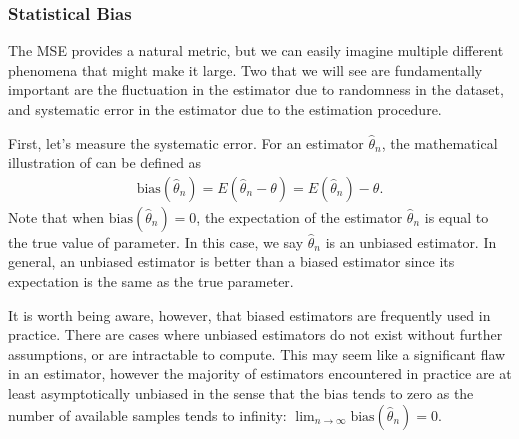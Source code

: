 \documentclass[letterpaper,11pt,english]{sphinxmanual}
\begin{document}
\subsubsection{Statistical Bias}
\label{\detokenize{chapter_appendix_math/statistics:statistical-bias}}
The MSE provides a natural metric, but we can easily imagine multiple
different phenomena that might make it large. Two that we will see are
fundamentally important are the fluctuation in the estimator due to
randomness in the dataset, and systematic error in the estimator due to
the estimation procedure.

First, let’s measure the systematic error. For an estimator
\(\hat{\theta}_n\), the mathematical illustration of  can be defined as
\begin{equation}\label{equation:chapter_appendix_math/statistics:eq_bias}
\begin{split}\mathrm{bias}(\hat{\theta}_n) = E(\hat{\theta}_n - \theta) = E(\hat{\theta}_n) - \theta.\end{split}
\end{equation}
Note that when \(\mathrm{bias}(\hat{\theta}_n) = 0\), the
expectation of the estimator \(\hat{\theta}_n\) is equal to the true
value of parameter. In this case, we say \(\hat{\theta}_n\) is an
unbiased estimator. In general, an unbiased estimator is better than a
biased estimator since its expectation is the same as the true
parameter.

It is worth being aware, however, that biased estimators are frequently
used in practice. There are cases where unbiased estimators do not exist
without further assumptions, or are intractable to compute. This may
seem like a significant flaw in an estimator, however the majority of
estimators encountered in practice are at least asymptotically unbiased
in the sense that the bias tends to zero as the number of available
samples tends to infinity:
\(\lim_{n \rightarrow \infty} \mathrm{bias}(\hat{\theta}_n) = 0\).
\end{document}
